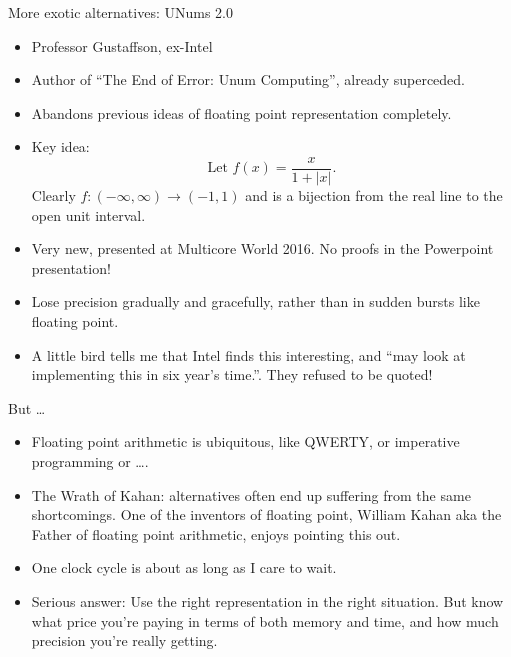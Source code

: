\documentclass{beamer}
\begin{document}
\begin{frame}{More exotic alternatives: UNums 2.0}
\begin{itemize}
\item Professor Gustaffson, ex-Intel\\
\item Author of ``The End of Error: Unum Computing'', already superceded.\\
\item Abandons previous ideas of floating point representation completely.
\item Key idea:
\begin{equation*}
\text{Let }f(x) = \frac{x}{1 + |x|}.
\end{equation*}
Clearly $f: (-\infty, \infty) \to (-1, 1)$ and is a bijection from the real line to the open unit interval.\\
\item Very new, presented at Multicore World 2016. No proofs in the Powerpoint presentation!\\
\item Lose precision gradually and gracefully, rather than in sudden bursts like floating point.\\
\item A little bird tells me that Intel finds this interesting, and ``may look at implementing this in
six year's time.''. They refused to be quoted!
\end{itemize}
\end{frame}

\begin{frame}{But \ldots}
\begin{itemize}
\item Floating point arithmetic is ubiquitous, like QWERTY, or imperative programming
or \ldots.
\item The Wrath of Kahan: alternatives often end up suffering from the same shortcomings. One of the inventors of
floating point, William Kahan aka the Father of floating point arithmetic, enjoys pointing this out.
\item One clock cycle is about as long as I care to wait.
\item Serious answer: Use the right representation in the right situation. But know what price you're paying 				in terms of both memory and time, and how much precision you're really getting.
\end{itemize}
\end{frame}
\end{document}
